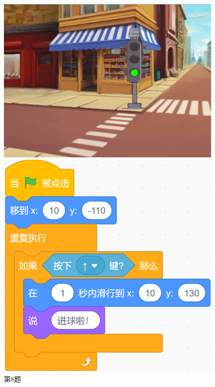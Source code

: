 \documentclass[10pt, a4paper]{article}
\begin{document}
\begin{enumerate}
\begin{figure}[htbp]
\begin{minipage}[t]{.28\textwidth}
\begin{minipage}[t]{.55\textwidth}
                    \centering
                    \includegraphics[width=\textwidth]{8-2.png}
                \end{minipage}
                \caption*{第8题}
            \end{minipage}
            \begin{minipage}[t]{.34\textwidth}
                \centering
                \begin{minipage}[t]{.58\textwidth}
                    \centering
                    \includegraphics[width=\textwidth]{9-1.png}

\end{minipage}
\end{minipage}
\end{figure}
\end{enumerate}
\end{document}
